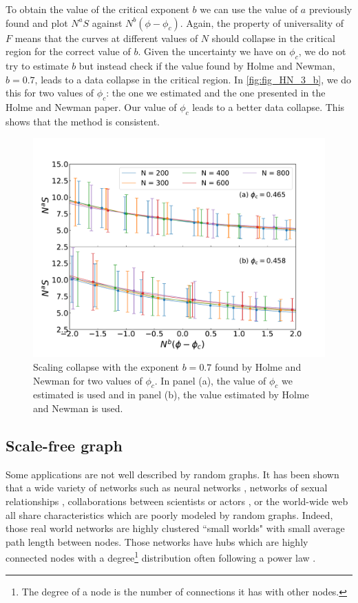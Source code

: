 \documentclass[11pt]{article}
\begin{document}
To obtain the value of the critical exponent $b$ we can use the value of $a$ previously found and plot $N^aS$ against $N^b(\phi-\phi_c)$. Again, the property of universality of $F$ means that the curves at different values of $N$ should collapse in the critical region for the correct value of $b$. Given the uncertainty we have on $\phi_c$, we do not try to estimate $b$ but instead check if the value found by Holme and Newman, $b=0.7$, leads to a data collapse in the critical region. In \autoref{fig:fig_HN_3_b}, we do this for two values of $\phi_c$: the one we estimated and the one presented in the Holme and Newman paper. Our value of $\phi_c$ leads to a better data collapse. This shows that the method is consistent.
\begin{figure}[h]
    \centering
    \includegraphics[width =0.8\linewidth]{figures/Fig3_n400_b.pdf}
    \caption{Scaling collapse with the exponent $b=0.7$ found by Holme and Newman for two values of $\phi_c$. In panel (a), the value of $\phi_c$ we estimated is used and in panel (b), the value estimated by Holme and Newman is used.}
    \label{fig:fig_HN_3_b}
\end{figure}

\subsection{Scale-free graph}
Some applications are not well described by random graphs. It has been shown that a wide variety of networks such as neural networks \citep{Watts1998}, networks of sexual relationships \citep{Liljeros2001}, collaborations between scientists \citep{Newman2001} or actors \citep{Watts1998, Barabasi1999}, or the world-wide web \citep{Albert1999} all share characteristics which are poorly modeled by random graphs. Indeed, those real world networks are highly clustered ``small worlds" with small average path length between nodes. Those networks have hubs which are highly connected nodes with a degree\footnote{The degree of a node is the number of connections it has with other nodes.} distribution often following a power law \citep{Barabasi1999}.
\end{document}

